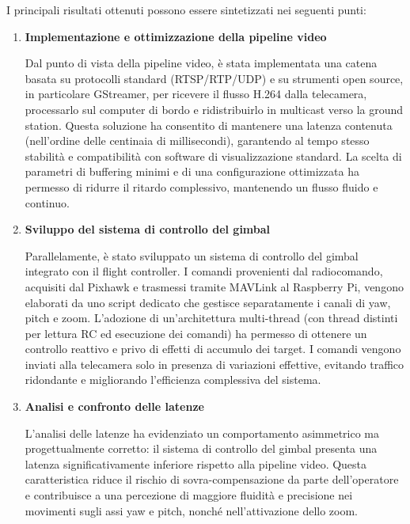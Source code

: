 \bigskip

I principali risultati ottenuti possono essere sintetizzati nei seguenti punti:

\begin{enumerate}

\item \textbf{Implementazione e ottimizzazione della pipeline video}  

Dal punto di vista della pipeline video, è stata implementata una catena
basata su protocolli standard (RTSP/RTP/UDP) e su strumenti open source,
in particolare GStreamer, per ricevere il flusso H.264 dalla telecamera,
processarlo sul computer di bordo e ridistribuirlo in multicast verso la
ground station. Questa soluzione ha consentito di mantenere una latenza
contenuta (nell’ordine delle centinaia di millisecondi), garantendo al tempo
stesso stabilità e compatibilità con software di visualizzazione standard.
La scelta di parametri di buffering minimi e di una configurazione ottimizzata
ha permesso di ridurre il ritardo complessivo, mantenendo un flusso fluido
e continuo.

\item \textbf{Sviluppo del sistema di controllo del gimbal}  

Parallelamente, è stato sviluppato un sistema di controllo del gimbal
integrato con il flight controller. I comandi provenienti dal radiocomando,
acquisiti dal Pixhawk e trasmessi tramite MAVLink al Raspberry Pi,
vengono elaborati da uno script dedicato che gestisce separatamente
i canali di yaw, pitch e zoom. L’adozione di un’architettura multi-thread
(con thread distinti per lettura RC ed esecuzione dei comandi) ha permesso
di ottenere un controllo reattivo e privo di effetti di accumulo dei target.
I comandi vengono inviati alla telecamera solo in presenza di variazioni
effettive, evitando traffico ridondante e migliorando l’efficienza complessiva
del sistema.

\item \textbf{Analisi e confronto delle latenze}  

L’analisi delle latenze ha evidenziato un comportamento asimmetrico ma
progettualmente corretto: il sistema di controllo del gimbal presenta
una latenza significativamente inferiore rispetto alla pipeline video.
Questa caratteristica riduce il rischio di sovra-compensazione da parte
dell’operatore e contribuisce a una percezione di maggiore fluidità
e precisione nei movimenti sugli assi yaw e pitch, nonché nell’attivazione
dello zoom.


\end{enumerate}
